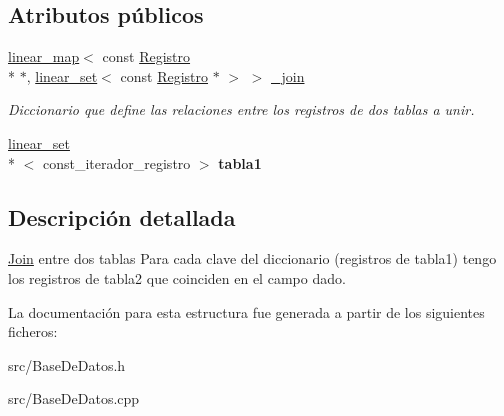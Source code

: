 \subsection*{Atributos públicos}
\begin{DoxyCompactItemize}
\item 
\hypertarget{structBaseDeDatos_1_1Join_aa40d69dd6bfd4281b0aeb3f192730825}{\hyperlink{classlinear__map}{linear\-\_\-map}$<$ const \hyperlink{classRegistro}{Registro} \\*
$\ast$, \hyperlink{classlinear__set}{linear\-\_\-set}$<$ const \hyperlink{classRegistro}{Registro} $\ast$ $>$ $>$ \hyperlink{structBaseDeDatos_1_1Join_aa40d69dd6bfd4281b0aeb3f192730825}{\-\_\-join}}\label{structBaseDeDatos_1_1Join_aa40d69dd6bfd4281b0aeb3f192730825}

\begin{DoxyCompactList}\small\item\em Diccionario que define las relaciones entre los registros de dos tablas a unir. \end{DoxyCompactList}\item 
\hypertarget{structBaseDeDatos_1_1Join_a20248fc0e89786c08c27e22ee4053ffb}{\hyperlink{classlinear__set}{linear\-\_\-set}\\*
$<$ const\-\_\-iterador\-\_\-registro $>$ {\bfseries tabla1}}\label{structBaseDeDatos_1_1Join_a20248fc0e89786c08c27e22ee4053ffb}

\end{DoxyCompactItemize}


\subsection{Descripción detallada}
\hyperlink{structBaseDeDatos_1_1Join}{Join} entre dos tablas Para cada clave del diccionario (registros de tabla1) tengo los registros de tabla2 que coinciden en el campo dado. 

La documentación para esta estructura fue generada a partir de los siguientes ficheros\-:\begin{DoxyCompactItemize}
\item 
src/Base\-De\-Datos.\-h\item 
src/Base\-De\-Datos.\-cpp\end{DoxyCompactItemize}
